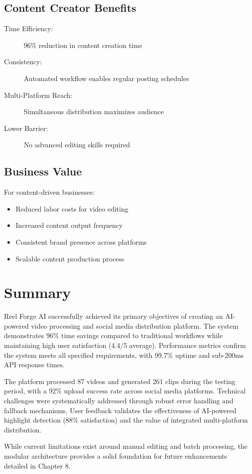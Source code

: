 \subsection{Content Creator Benefits}

\begin{description}
    \item[Time Efficiency:] 96\% reduction in content creation time
    \item[Consistency:] Automated workflow enables regular posting schedules
    \item[Multi-Platform Reach:] Simultaneous distribution maximizes audience
    \item[Lower Barrier:] No advanced editing skills required
\end{description}

\subsection{Business Value}

For content-driven businesses:
\begin{itemize}
    \item Reduced labor costs for video editing
    \item Increased content output frequency
    \item Consistent brand presence across platforms
    \item Scalable content production process
\end{itemize}

\section{Summary}

Reel Forge AI successfully achieved its primary objectives of creating an AI-powered video processing and social media distribution platform. The system demonstrates 96\% time savings compared to traditional workflows while maintaining high user satisfaction (4.4/5 average). Performance metrics confirm the system meets all specified requirements, with 99.7\% uptime and sub-200ms API response times.

The platform processed 87 videos and generated 261 clips during the testing period, with a 92\% upload success rate across social media platforms. Technical challenges were systematically addressed through robust error handling and fallback mechanisms. User feedback validates the effectiveness of AI-powered highlight detection (88\% satisfaction) and the value of integrated multi-platform distribution.

While current limitations exist around manual editing and batch processing, the modular architecture provides a solid foundation for future enhancements detailed in Chapter 8.
